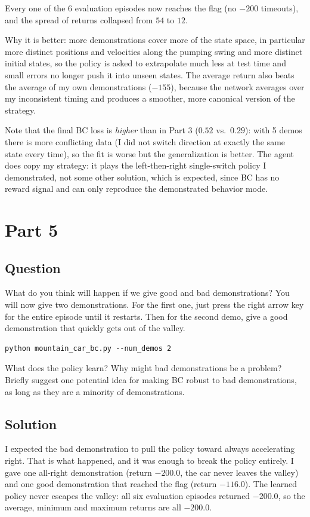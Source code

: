\documentclass[12pt]{article}%
\begin{document}
Every one of the 6 evaluation episodes now reaches the flag (no $-200$ timeouts), and the
spread of returns collapsed from $54$ to $12$.

Why it is better: more demonstrations cover more of the state space, in particular more
distinct positions and velocities along the pumping swing and more distinct initial
states, so the policy is asked to extrapolate much less at test time and small errors no longer
push it into unseen states. The average return also beats the average of my own
demonstrations ($-155$), because the network averages over my inconsistent timing and
produces a smoother, more canonical version of the strategy.

Note that the final BC loss is \emph{higher} than in Part 3 ($0.52$ vs.\ $0.29$): with 5
demos there is more conflicting data (I did not switch direction at exactly the same state
every time), so the fit is worse but the generalization is better. The agent does copy my
strategy: it plays the left-then-right single-switch policy I demonstrated, not some
other solution, which is expected, since BC has no reward signal and can only reproduce
the demonstrated behavior mode.




\section{Part 5}

\subsection{Question}
What do you think will happen if we give good and bad demonstrations?
You will now give two demonstrations. For the first one, just press the right
arrow key for the entire episode until it restarts. Then for the second demo,
give a good demonstration that quickly gets out of the valley.
\begin{verbatim}
python mountain_car_bc.py --num_demos 2
\end{verbatim}
What does the policy learn? Why might bad demonstrations be a problem? Briefly
suggest one potential idea for making BC robust to bad demonstrations, as long as
they are a minority of demonstrations.

\subsection{Solution}
I expected the bad demonstration to pull the policy toward always
accelerating right. That is what happened, and it was enough to break the policy
entirely. I gave one all-right demonstration (return $-200.0$, the car never leaves the
valley) and one good demonstration that reached the flag (return $-116.0$). The learned
policy never escapes the valley: all six evaluation episodes returned $-200.0$, so the
average, minimum and maximum returns are all $-200.0$.
\end{document}
